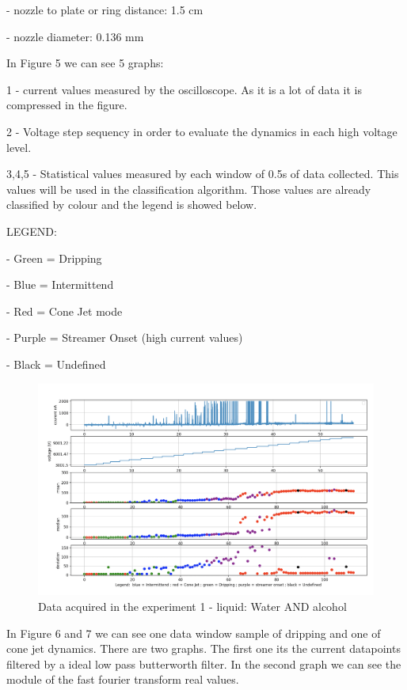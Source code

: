     - nozzle to plate or ring distance: 1.5 cm

    - nozzle diameter: 0.136 mm

    In Figure 5 we can see 5 graphs: 

    1 - current values measured by the oscilloscope. As it is a lot of data it is compressed in the figure.

    2 - Voltage step sequency in order to evaluate the dynamics in each high voltage level.

    3,4,5 - Statistical values measured by each window of 0.5s of data collected. This values will be used in the classification algorithm.
    Those values are already classified by colour and the legend is showed below.

    LEGEND:

    - Green = Dripping

    - Blue =  Intermittend

    - Red = Cone Jet mode

    - Purple = Streamer Onset (high current values)

    - Black = Undefined

    \begin{figure}[H]
        \center
        \includegraphics[width=17cm]{images/images_folder_2/img1.png}
        \caption{Data acquired in the experiment 1 - liquid: Water AND alcohol}
    \end{figure}

    In Figure 6 and 7 we can see one data window sample of dripping and one of cone jet dynamics. There are two graphs. The first one its
    the current datapoints filtered by a ideal low pass butterworth filter. In the second graph we can see the module of the fast fourier transform real values.

